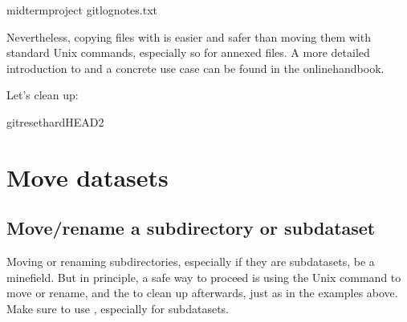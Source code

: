 \begin{sphinxVerbatim}[commandchars=\\\{\}]
midterm\PYGZus{}project
gitlognotes.txt

\end{sphinxVerbatim}

\sphinxAtStartPar
Nevertheless, copying files with  is easier and safer
than moving them with standard Unix commands, especially so for annexed files.
A more detailed introduction to  and a concrete
use case can be found in the online\sphinxhyphen{}handbook.

\sphinxAtStartPar
Let’s clean up:

\begin{sphinxVerbatim}[commandchars=\\\{\}]
gitreset\PYGZhy{}\PYGZhy{}hardHEAD\PYGZti{}2
\end{sphinxVerbatim}


\section{Move datasets}
\label{\detokenize{basics/101-136-filesystem:move-datasets}}
\ignorespaces 

\subsection{Move/rename a subdirectory or subdataset}
\label{\detokenize{basics/101-136-filesystem:move-rename-a-subdirectory-or-subdataset}}\label{\detokenize{basics/101-136-filesystem:index-10}}
\sphinxAtStartPar
Moving or renaming subdirectories, especially if they are subdatasets,
 be a minefield. But in principle, a safe way to proceed is using
the Unix  command to move or rename, and the 
to clean up afterwards, just as in the examples above. Make sure to
 use , especially for subdatasets.

